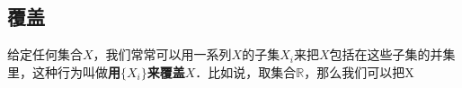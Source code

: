 
\subsection{覆盖}

给定任何集合$X$，我们常常可以用一系列$X$的子集$X_i$来把$X$包括在这些子集的并集里，这种行为叫做\textbf{用$\{X_i\}$来覆盖$X$}．比如说，取集合$\mathbb{R}$，那么我们可以把X